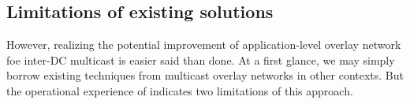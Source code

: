 
%
%
%
%

\subsection{Limitations of existing solutions}
\label{subsec:motivation:baseline}

However, realizing the potential improvement of application-level overlay network foe inter-DC multicast is easier said than done. At a first glance, we may simply borrow existing techniques
from multicast overlay networks in other contexts.
But the operational experience of \company indicates
two limitations of this approach.

